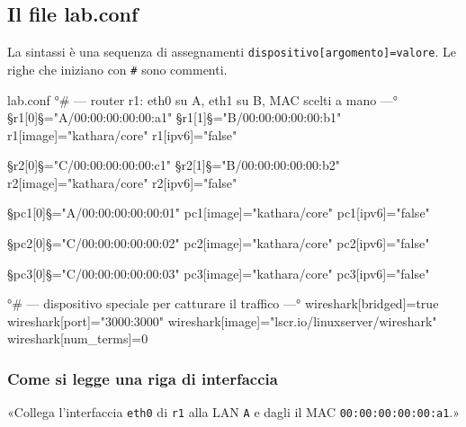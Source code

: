 \subsection{Il file lab.conf}
La sintassi è una sequenza di assegnamenti \texttt{dispositivo[argomento]=valore}. Le righe che iniziano con \texttt{\#} sono commenti.
\begin{filecfg}{lab.conf}
°# --- router r1: eth0 su A, eth1 su B, MAC scelti a mano ---°
§r1[0]§="A/00:00:00:00:00:a1"
§r1[1]§="B/00:00:00:00:00:b1"
r1[image]="kathara/core"
r1[ipv6]="false"

§r2[0]§="C/00:00:00:00:00:c1"
§r2[1]§="B/00:00:00:00:00:b2"
r2[image]="kathara/core"
r2[ipv6]="false"

§pc1[0]§="A/00:00:00:00:00:01"
pc1[image]="kathara/core"
pc1[ipv6]="false"

§pc2[0]§="C/00:00:00:00:00:02"
pc2[image]="kathara/core"
pc2[ipv6]="false"

§pc3[0]§="C/00:00:00:00:00:03"
pc3[image]="kathara/core"
pc3[ipv6]="false"

°# --- dispositivo speciale per catturare il traffico ---°
wireshark[bridged]=true
wireshark[port]="3000:3000"
wireshark[image]="lscr.io/linuxserver/wireshark"
wireshark[num_terms]=0
\end{filecfg}

\subsubsection{Come si legge una riga di interfaccia}
\begin{center}
\end{center}
«Collega l'interfaccia \texttt{eth0} di \texttt{r1} alla LAN \texttt{A} e dagli il MAC \texttt{00:00:00:00:00:a1}.»

